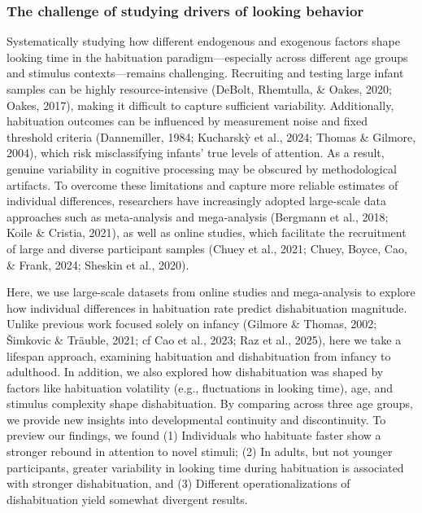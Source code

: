 \documentclass[10pt, letterpaper]{article}
\begin{document}
\hypertarget{the-challenge-of-studying-drivers-of-looking-behavior}{%
\subsubsection{The challenge of studying drivers of looking
behavior}\label{the-challenge-of-studying-drivers-of-looking-behavior}}

Systematically studying how different endogenous and exogenous factors
shape looking time in the habituation paradigm---especially across
different age groups and stimulus contexts---remains challenging.
Recruiting and testing large infant samples can be highly
resource-intensive (DeBolt, Rhemtulla, \& Oakes, 2020; Oakes, 2017),
making it difficult to capture sufficient variability. Additionally,
habituation outcomes can be influenced by measurement noise and fixed
threshold criteria (Dannemiller, 1984; Kucharskỳ et al., 2024; Thomas \&
Gilmore, 2004), which risk misclassifying infants' true levels of
attention. As a result, genuine variability in cognitive processing may
be obscured by methodological artifacts. To overcome these limitations
and capture more reliable estimates of individual differences,
researchers have increasingly adopted large-scale data approaches such
as meta-analysis and mega-analysis (Bergmann et al., 2018; Koile \&
Cristia, 2021), as well as online studies, which facilitate the
recruitment of large and diverse participant samples (Chuey et al.,
2021; Chuey, Boyce, Cao, \& Frank, 2024; Sheskin et al., 2020).

Here, we use large-scale datasets from online studies and mega-analysis
to explore how individual differences in habituation rate predict
dishabituation magnitude. Unlike previous work focused solely on infancy
(Gilmore \& Thomas, 2002; Šimkovic \& Träuble, 2021; cf Cao et al.,
2023; Raz et al., 2025), here we take a lifespan approach, examining
habituation and dishabituation from infancy to adulthood. In addition,
we also explored how dishabituation was shaped by factors like
habituation volatility (e.g., fluctuations in looking time), age, and
stimulus complexity shape dishabituation. By comparing across three age
groups, we provide new insights into developmental continuity and
discontinuity. To preview our findings, we found (1) Individuals who
habituate faster show a stronger rebound in attention to novel stimuli;
(2) In adults, but not younger participants, greater variability in
looking time during habituation is associated with stronger
dishabituation, and (3) Different operationalizations of dishabituation
yield somewhat divergent results.
\end{document}
